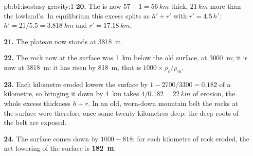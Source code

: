 \begin{solution}{pb:b1:isostasy-gravity:1}
\textbf{20.} The  is now $57 - 1 = \qty{56}{km}$ thick, $\qty{21}{km}$ more
than the lowland's. In equilibrium this excess splits as $h' + r'$ with
$r' = 4.5\,h'$: $h' = 21/5.5 = \qty{3.818}{km}$ and $r' = \qty{17.18}{km}$.

\textbf{21.} The plateau now stands at \qty{3818}{m}.

\textbf{22.} The rock now at the surface was \qty{1}{km} below the old surface,
at \qty{3000}{m}; it is now at \qty{3818}{m}: it has risen by \qty{818}{m},
that is $1000\times\rho_c/\rho_m$.

\textbf{23.} Each kilometre eroded lowers the surface by $1 - 2700/3300 =
0.182$ of a kilometre, so bringing it down by \qty{4}{km} takes
$4/0.182 = \qty{22}{km}$ of erosion, the whole excess thickness $h + r$. In an
old, worn-down mountain belt the rocks at the surface were therefore once some
twenty kilometres deep: the deep roots of the belt are exposed.

\textbf{24.} The surface comes down by $1000 - 818$: for each kilometre of rock
eroded, the net lowering of the surface is
\textbf{\qty[text-series-to-math=true]{182}{m}}.
\end{solution}
